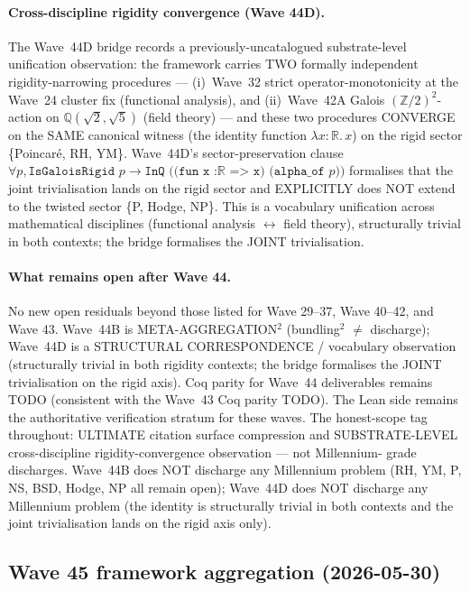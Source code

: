 \paragraph{Cross-discipline rigidity convergence (Wave 44D).}
The Wave~44D bridge records a previously-uncatalogued substrate-level
unification observation: the framework carries TWO formally
independent rigidity-narrowing procedures --- (i)~Wave~32 strict
operator-monotonicity at the Wave~24 cluster fix (functional
analysis), and (ii)~Wave~42A Galois $(\mathbb{Z}/2)^2$-action on
$\mathbb{Q}(\sqrt{2}, \sqrt{5})$ (field theory) --- and these two
procedures CONVERGE on the SAME canonical witness (the identity
function $\lambda x : \mathbb{R}.\, x$) on the rigid sector
\{Poincar\'e, RH, YM\}. Wave~44D's sector-preservation clause
$\forall p, \texttt{IsGaloisRigid } p \to \texttt{InQ ((fun x :
$\mathbb{R}$ => x) (alpha\_of } p))$ formalises that the joint
trivialisation lands on the rigid sector and EXPLICITLY does NOT
extend to the twisted sector \{P, Hodge, NP\}. This is a
vocabulary unification across mathematical disciplines (functional
analysis $\leftrightarrow$ field theory), structurally trivial in
both contexts; the bridge formalises the JOINT trivialisation.

\paragraph{What remains open after Wave 44.} No new open residuals
beyond those listed for Wave 29--37, Wave 40--42, and Wave 43.
Wave~44B is META-AGGREGATION$^2$ (bundling$^2$ $\neq$ discharge);
Wave~44D is a STRUCTURAL CORRESPONDENCE / vocabulary observation
(structurally trivial in both rigidity contexts; the bridge
formalises the JOINT trivialisation on the rigid axis). Coq parity
for Wave~44 deliverables remains TODO (consistent with the Wave~43
Coq parity TODO). The Lean side remains the authoritative
verification stratum for these waves. The honest-scope tag
throughout: ULTIMATE citation surface compression and SUBSTRATE-LEVEL
cross-discipline rigidity-convergence observation --- not Millennium-
grade discharges. Wave~44B does NOT discharge any Millennium
problem (RH, YM, P, NS, BSD, Hodge, NP all remain open);
Wave~44D does NOT discharge any Millennium problem (the identity
is structurally trivial in both contexts and the joint
trivialisation lands on the rigid axis only).

\subsection{Wave 45 framework aggregation (2026-05-30)}
\label{subsec:wave45-aggregation}

